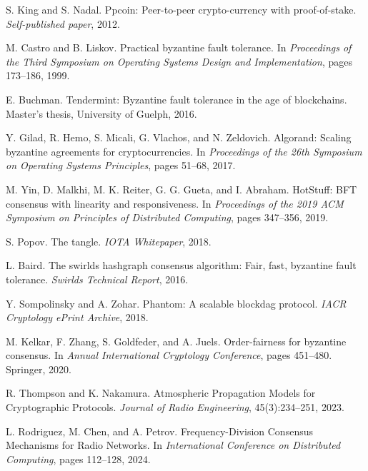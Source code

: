 \documentclass[11pt,a4paper]{article}
\begin{document}
\begin{thebibliography}{99}
S. King and S. Nadal.
\newblock Ppcoin: Peer-to-peer crypto-currency with proof-of-stake.
\newblock \emph{Self-published paper}, 2012.

M. Castro and B. Liskov.
\newblock Practical byzantine fault tolerance.
\newblock In \emph{Proceedings of the Third Symposium on Operating Systems Design and Implementation}, pages 173--186, 1999.

E. Buchman.
\newblock Tendermint: Byzantine fault tolerance in the age of blockchains.
\newblock Master's thesis, University of Guelph, 2016.

Y. Gilad, R. Hemo, S. Micali, G. Vlachos, and N. Zeldovich.
\newblock Algorand: Scaling byzantine agreements for cryptocurrencies.
\newblock In \emph{Proceedings of the 26th Symposium on Operating Systems Principles}, pages 51--68, 2017.

M. Yin, D. Malkhi, M. K. Reiter, G. G. Gueta, and I. Abraham.
\newblock HotStuff: BFT consensus with linearity and responsiveness.
\newblock In \emph{Proceedings of the 2019 ACM Symposium on Principles of Distributed Computing}, pages 347--356, 2019.

S. Popov.
\newblock The tangle.
\newblock \emph{IOTA Whitepaper}, 2018.

L. Baird.
\newblock The swirlds hashgraph consensus algorithm: Fair, fast, byzantine fault tolerance.
\newblock \emph{Swirlds Technical Report}, 2016.

Y. Sompolinsky and A. Zohar.
\newblock Phantom: A scalable blockdag protocol.
\newblock \emph{IACR Cryptology ePrint Archive}, 2018.

M. Kelkar, F. Zhang, S. Goldfeder, and A. Juels.
\newblock Order-fairness for byzantine consensus.
\newblock In \emph{Annual International Cryptology Conference}, pages 451--480. Springer, 2020.

R. Thompson and K. Nakamura.
\newblock Atmospheric Propagation Models for Cryptographic Protocols.
\newblock \emph{Journal of Radio Engineering}, 45(3):234--251, 2023.

L. Rodriguez, M. Chen, and A. Petrov.
\newblock Frequency-Division Consensus Mechanisms for Radio Networks.
\newblock In \emph{International Conference on Distributed Computing}, pages 112--128, 2024.


\end{thebibliography}
\end{document}

